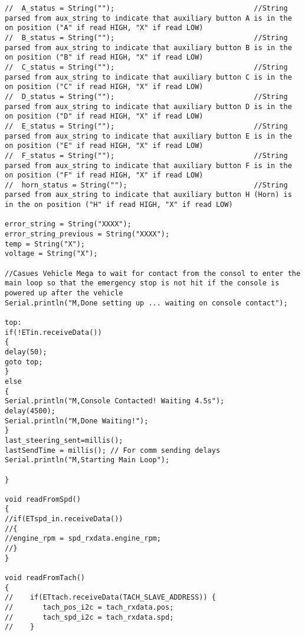 \begin{lstlisting}[breaklines=true,basicstyle=\tiny]
//  A_status = String("");                                 //String parsed from aux_string to indicate that auxiliary button A is in the on position ("A" if read HIGH, "X" if read LOW)
//  B_status = String("");                                 //String parsed from aux_string to indicate that auxiliary button B is in the on position ("B" if read HIGH, "X" if read LOW)
//  C_status = String("");                                 //String parsed from aux_string to indicate that auxiliary button C is in the on position ("C" if read HIGH, "X" if read LOW)   
//  D_status = String("");                                 //String parsed from aux_string to indicate that auxiliary button D is in the on position ("D" if read HIGH, "X" if read LOW)
//  E_status = String("");                                 //String parsed from aux_string to indicate that auxiliary button E is in the on position ("E" if read HIGH, "X" if read LOW)
//  F_status = String("");                                 //String parsed from aux_string to indicate that auxiliary button F is in the on position ("F" if read HIGH, "X" if read LOW)
//  horn_status = String("");                              //String parsed from aux_string to indicate that auxiliary button H (Horn) is in the on position ("H" if read HIGH, "X" if read LOW)

error_string = String("XXXX");
error_string_previous = String("XXXX");
temp = String("X");
voltage = String("X");

//Casues Vehicle Mega to wait for contact from the consol to enter the main loop so that the emergency stop is not hit if the console is powered up after the vehicle
Serial.println("M,Done setting up ... waiting on console contact");

top:
if(!ETin.receiveData())  
{
delay(50);
goto top;
}
else
{
Serial.println("M,Console Contacted! Waiting 4.5s");
delay(4500);
Serial.println("M,Done Waiting!");
}
last_steering_sent=millis();  
lastSendTime = millis(); // For comm sending delays
Serial.println("M,Starting Main Loop");

}

void readFromSpd()
{
//if(ETspd_in.receiveData())
//{
//engine_rpm = spd_rxdata.engine_rpm; 
//}
}

void readFromTach()
{
//    if(ETtach.receiveData(TACH_SLAVE_ADDRESS)) {
//       tach_pos_i2c = tach_rxdata.pos;
//       tach_spd_i2c = tach_rxdata.spd;
//    }


\end{lstlisting}
